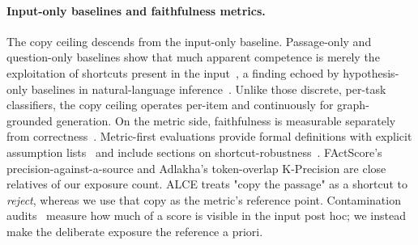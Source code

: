 \documentclass[10pt,twocolumn]{article}
\begin{document}
\paragraph{Input-only baselines and faithfulness metrics.}
The copy ceiling descends from the input-only baseline. Passage-only and question-only baselines show that much apparent competence is merely the exploitation of shortcuts present in the input~\cite{kaushik2018reading}, a finding echoed by hypothesis-only baselines in natural-language inference~\cite{gururangan2018artifacts,poliak2018hypothesis}. Unlike those discrete, per-task classifiers, the copy ceiling operates per-item and continuously for graph-grounded generation. On the metric side, faithfulness is measurable separately from correctness~\cite{es2023ragas,adlakha2024evaluating,zhou2023contextfaithful}. Metric-first evaluations provide formal definitions with explicit assumption lists~\cite{min2023factscore} and include sections on shortcut-robustness~\cite{gao2023alce}. FActScore's precision-against-a-source and Adlakha's token-overlap K-Precision are close relatives of our exposure count. ALCE treats "copy the passage" as a shortcut to \emph{reject}, whereas we use that copy as the metric's reference point. Contamination audits~\cite{sainz2023contamination,golchin2024timetravel} measure how much of a score is visible in the input post hoc; we instead make the deliberate exposure the reference a priori.
\end{document}

